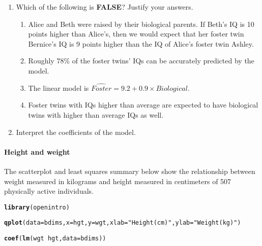 \documentclass[10pt]{article}\usepackage[]{graphicx}\usepackage[]{color}
\makeatletter
\newcommand{\hlstr}[1]{\textcolor[rgb]{0.192,0.494,0.8}{#1}}%
\newcommand{\hlopt}[1]{\textcolor[rgb]{0,0,0}{#1}}%
\newcommand{\hlstd}[1]{\textcolor[rgb]{0.345,0.345,0.345}{#1}}%
\newcommand{\hlkwc}[1]{\textcolor[rgb]{0.333,0.667,0.333}{#1}}%
\newcommand{\hlkwd}[1]{\textcolor[rgb]{0.737,0.353,0.396}{\textbf{#1}}}%
\newenvironment{kframe}{%
 \def\at@end@of@kframe{}%
 \ifinner\ifhmode%
  \def\at@end@of@kframe{\end{minipage}}%
  \begin{minipage}{\columnwidth}%
 \fi\fi%
 \def\FrameCommand##1{\hskip\@totalleftmargin \hskip-\fboxsep
 \colorbox{shadecolor}{##1}\hskip-\fboxsep
     \hskip-\linewidth \hskip-\@totalleftmargin \hskip\columnwidth}%
 \MakeFramed {\advance\hsize-\width
   \@totalleftmargin\z@ \linewidth\hsize
   \@setminipage}}%
 {\par\unskip\endMakeFramed%
 \at@end@of@kframe}
\newenvironment{knitrout}{}{} %
\makeatother
\begin{document}
\begin{enumerate}
\item Which of the following is \textbf{FALSE}? Justify your answers.

\begin{enumerate}
  \itemsep0.7in
\item Alice and Beth were raised by their biological parents. If Beth's IQ is 10 points higher than Alice's, then we would expect that her foster twin Bernice's IQ is 9 points higher than the IQ of Alice's foster twin Ashley. 
\item Roughly 78\% of the foster twins' IQs can be accurately predicted by the model.
\item The linear model is $\widehat{Foster} = 9.2 + 0.9 \times Biological$.
\item Foster twins with IQs higher than average are expected to have biological twins with higher than average IQs as well.
  \vspace{0.5in}
\end{enumerate}

\item Interpret the coefficients of the model. 
\end{enumerate}




\clearpage
\paragraph{Height and weight} The scatterplot and least squares summary below show the relationship between weight measured in kilograms and height measured in centimeters of 507 physically active individuals.
\begin{knitrout}\footnotesize
{}\color{fgcolor}\begin{kframe}
\begin{alltt}
\hlkwd{library}\hlstd{(openintro)}
\end{alltt}


{\ttfamily\noindent\bfseries\color{errorcolor}{\#\# Error in library(openintro): there is no package called 'openintro'}}\begin{alltt}
\hlkwd{qplot}\hlstd{(}\hlkwc{data} \hlstd{= bdims,} \hlkwc{x} \hlstd{= hgt,} \hlkwc{y} \hlstd{= wgt,} \hlkwc{xlab} \hlstd{=} \hlstr{"Height (cm)"}\hlstd{,} \hlkwc{ylab} \hlstd{=} \hlstr{"Weight (kg)"}\hlstd{)}
\end{alltt}


{\ttfamily\noindent\bfseries\color{errorcolor}{\#\# Error in ggplot(data, aesthetics, environment = env): object 'bdims' not found}}\begin{alltt}
\hlkwd{coef}\hlstd{(}\hlkwd{lm}\hlstd{(wgt} \hlopt{~} \hlstd{hgt,} \hlkwc{data} \hlstd{= bdims))}
\end{alltt}


{\ttfamily\noindent\bfseries\color{errorcolor}{\#\# Error in is.data.frame(data): object 'bdims' not found}}\end{kframe}
\end{knitrout}
 
\end{document}
